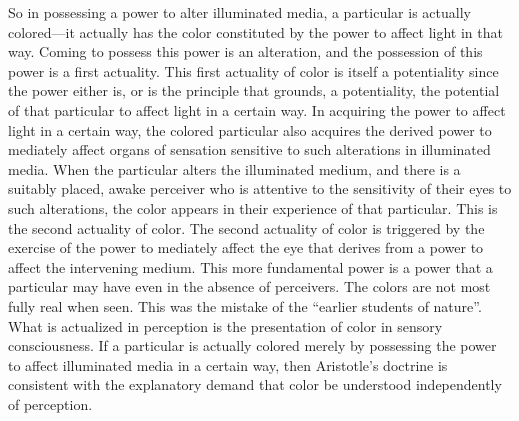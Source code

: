 So in possessing a power to alter illuminated media, a particular is actually colored---it actually has the color constituted by the power to affect light in that way. Coming to possess this power is an alteration, and the possession of this power is a first actuality. This first actuality of color is itself a potentiality since the power either is, or is the principle that grounds, a potentiality, the potential of that particular to affect light in a certain way. In acquiring the power to affect light in a certain way, the colored particular also acquires the derived power to mediately affect organs of sensation sensitive to such alterations in illuminated media. When the particular alters the illuminated medium, and there is a suitably placed, awake perceiver who is attentive to the sensitivity of their eyes to such alterations, the color appears in their experience of that particular. This is the second actuality of color. The second actuality of color is triggered by the exercise of the power to mediately affect the eye that derives from a power to affect the intervening medium. This more fundamental power is a power that a particular may have even in the absence of perceivers. The colors are not most fully real when seen. This was the mistake of the ``earlier students of nature''. What is actualized in perception is the presentation of color in sensory consciousness. If a particular is actually colored merely by possessing the power to affect illuminated media in a certain way, then Aristotle's doctrine is consistent with the explanatory demand that color be understood independently of perception.

